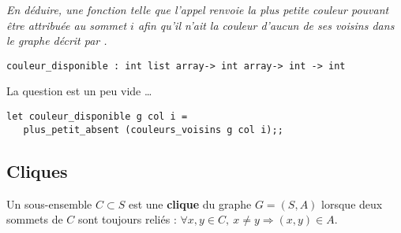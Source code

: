 \begin{Exercise}\it
En déduire, une fonction  telle que l'appel  renvoie la plus petite couleur pouvant être attribuée au sommet $i$ afin qu'il n'ait la couleur d'aucun de ses voisins dans le graphe décrit par .
\end{Exercise}  
\begin{lstlisting}
couleur_disponible : int list array-> int array-> int -> int
\end{lstlisting}
\begin{Answer}
La question est un peu vide \dots
\begin{lstlisting}
let couleur_disponible g col i =
   plus_petit_absent (couleurs_voisins g col i);;
\end{lstlisting} 
\end{Answer}
\subsection{Cliques}
Un sous-ensemble $C\subset S$ est une {\bf clique} du graphe $G = (S, A)$ lorsque deux sommets de $C$ sont toujours reliés : $\forall x,y\in C,\ x\ne y\Rightarrow (x,y)\in A$.

